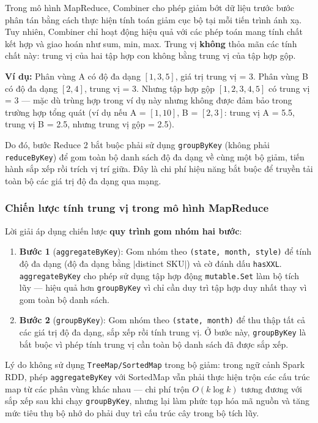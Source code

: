 Trong mô hình MapReduce, Combiner cho phép giảm bớt dữ liệu trước bước phân tán bằng cách thực hiện tính toán giảm cục bộ tại mỗi tiến trình ánh xạ. Tuy nhiên, Combiner chỉ hoạt động hiệu quả với các phép toán mang tính chất kết hợp và giao hoán như sum, min, max. Trung vị \textbf{không} thỏa mãn các tính chất này: trung vị của hai tập hợp con không bằng trung vị của tập hợp gộp.

\textbf{Ví dụ:} Phân vùng A có độ đa dạng $[1, 3, 5]$, giá trị trung vị = 3. Phân vùng B có độ đa dạng $[2, 4]$, trung vị = 3. Nhưng tập hợp gộp $[1, 2, 3, 4, 5]$ có trung vị = 3 --- mặc dù trùng hợp trong ví dụ này nhưng không được đảm bảo trong trường hợp tổng quát (ví dụ nếu A = $[1, 10]$, B = $[2, 3]$: trung vị A = 5.5, trung vị B = 2.5, nhưng trung vị gộp = 2.5).

Do đó, bước Reduce 2 bắt buộc phải sử dụng \texttt{groupByKey} (không phải \texttt{reduceByKey}) để gom toàn bộ danh sách độ đa dạng về cùng một bộ giảm, tiến hành sắp xếp rồi trích vị trí giữa. Đây là chi phí hiệu năng bắt buộc để truyền tải toàn bộ các giá trị độ đa dạng qua mạng.

\subsubsection{Chiến lược tính trung vị trong mô hình MapReduce}

Lời giải áp dụng chiến lược \textbf{quy trình gom nhóm hai bước}:

\begin{enumerate}
    \item \textbf{Bước 1} (\texttt{aggregateByKey}): Gom nhóm theo \texttt{(state, month, style)} để tính độ đa dạng (độ đa dạng bằng $|$distinct SKU$|$) và cờ đánh dấu \texttt{hasXXL}. \texttt{aggregateByKey} cho phép sử dụng tập hợp động \texttt{mutable.Set} làm bộ tích lũy --- hiệu quả hơn \texttt{groupByKey} vì chỉ cần duy trì tập hợp duy nhất thay vì gom toàn bộ danh sách.
    \item \textbf{Bước 2} (\texttt{groupByKey}): Gom nhóm theo \texttt{(state, month)} để thu thập tất cả các giá trị độ đa dạng, sắp xếp rồi tính trung vị. Ở bước này, \texttt{groupByKey} là bắt buộc vì phép tính trung vị cần toàn bộ danh sách đã được sắp xếp.
\end{enumerate}

Lý do không sử dụng \texttt{TreeMap/SortedMap} trong bộ giảm: trong ngữ cảnh Spark RDD, phép \texttt{aggregateByKey} với SortedMap vẫn phải thực hiện trộn các cấu trúc map từ các phân vùng khác nhau --- chi phí trộn $O(k \log k)$ tương đương với sắp xếp sau khi chạy \texttt{groupByKey}, nhưng lại làm phức tạp hóa mã nguồn và tăng mức tiêu thụ bộ nhớ do phải duy trì cấu trúc cây trong bộ tích lũy.

